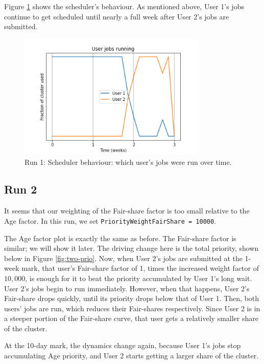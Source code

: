 \documentclass{article}
\newcommand{\code}[1]{\texttt{#1}}
\begin{document}
\clearpage
Figure \ref{fig:one-jobs} shows the scheduler's behaviour.  As
mentioned above, User 1's jobs continue to get scheduled until nearly
a full week after User 2's jobs are submitted.
\begin{figure}[h!]
  \begin{center}
    \includegraphics[width=0.8\textwidth]{sim-1-ujobs}
  \end{center}
  \caption{Run 1: Scheduler behaviour: which user's jobs were run over time.
    \label{fig:one-jobs}}
\end{figure}

\clearpage
\subsection{Run 2}
It seems that our weighting of the Fair-share factor is too small
relative to the Age factor.  In this run, we set
\code{PriorityWeightFairShare = 10000}.

The Age factor plot is exactly the same as before.  The Fair-share
factor is similar; we will show it later.  The driving change here is
the total priority, shown below in Figure \ref{fig:two-prio}.  Now,
when User 2's jobs are submitted at the 1-week mark, that user's
Fair-share factor of 1, times the increased weight factor of $10,000$,
is enough for it to beat the priority accumulated by User 1's long
wait.  User 2's jobs begin to run immediately.  However, when that
happens, User 2's Fair-share drops quickly, until its priority drops
below that of User 1.  Then, both users' jobs are run, which reduces
their Fair-shares respectively.  Since User 2 is in a steeper portion
of the Fair-share curve, that user gets a relatively smaller share of
the cluster.

At the 10-day mark, the dynamics change again, because User 1's jobs
stop accumulating Age priority, and User 2 starts getting a larger
share of the cluster.
\end{document}
